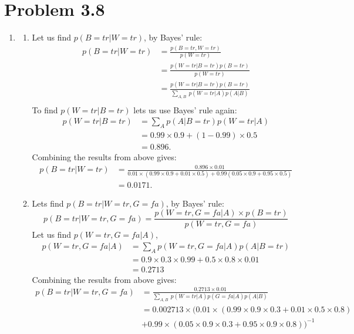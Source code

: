 \documentclass[11pt,a4paper,oneside]{report}
\begin{document}
\section*{Problem 3.8}
\begin{enumerate}
	\item 
	\begin{enumerate}
		\item Let us find $p(B=tr|W=tr)$, by Bayes' rule:
		\begin{align}
		p(B=tr|W=tr) &= \frac{p(B = tr , W = tr)}{p(W =tr)} \\
		&= \frac{p(W = tr | B = tr)p(B = tr)}{p(W=tr)} \\
		&= \frac{p(W = tr | B = tr)p(B = tr)}{\sum_{A, B}~p(W = tr| A)p(A|B)}\\		
		\end{align}
	To find $p(W = tr | B = tr)$ lets us use Bayes' rule again:
	\begin{align}
	p(W = tr | B = tr) &= \sum_{A} p(A|B=tr)p(W = tr|A)\\
	&= 0.99\times0.9+(1-0.99)\times0.5\\
	&= 0.896.
	\end{align}
	Combining the results from above gives:
	\begin{align}
	p(B=tr|W=tr) &= \frac{0.896\times0.01}{0.01\times(0.99\times0.9+0.01\times 0.5)+0.99(0.05\times 0.9 + 0.95\times 0.5)}\\
	&= 0.0171.
	\end{align}
	\item
	Lets find $p(B=tr|W=tr,G=fa)$, by Bayes' rule:
	\begin{equation}
	p(B=tr|W=tr,G=fa) = \frac{p(W=tr, G=fa | A)\times p(B=tr)}{p(W=tr, G=fa)}
	\end{equation}
	Let us find $p(W=tr, G=fa | A)$,
	\begin{align}
	p(W=tr, G=fa | A) &= \sum_{A} p(W=tr, G=fa |A)p(A|B=tr)\\
	&=0.9 \times 0.3 \times 0.99+ 0.5\times 0.8 \times 0.01\\
	&= 0.2713
	\end{align}
	Combining the results from above gives:
	\begin{align}
	p(B=tr|W=tr,G=fa) &= \frac{0.2713 \times 0.01}{\sum_{A,B}~p(W=tr |A) p(G=fa|A) p(A|B)}\\
	&= {0.002713}\times(0.01\times (0.99 \times 0.9 \times 0.3 + 0.01 \times 0.5 \times 0.8) \nonumber \\
	&+0.99\times(0.05 \times 0.9 \times 0.3 + 0.95 \times 0.9 \times 0.8))^{-1}\\

\end{align}
\end{enumerate}
\end{enumerate}
\end{document}
